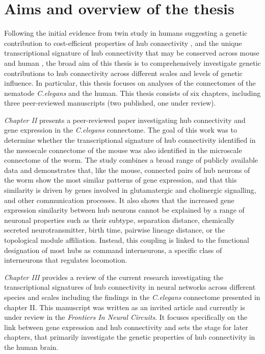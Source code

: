 \section{Aims and overview of the thesis}

Following the initial evidence from twin study in humans suggesting a genetic contribution to cost-efficient properties of hub connectivity \citep{Fornito2011}, and the unique transcriptional signature of hub connectivity that may be conserved across mouse and human \citep{Vertes2016b,Fulcher2016}, the broad aim of this thesis is to comprehensively investigate genetic contributions to hub connectivity across different scales and levels of genetic influence. In particular, this thesis focuses on analyses of the connectomes of the nematode \textit{C.elegans} and the human. This thesis consists of six chapters, including three peer-reviewed manuscripts (two published, one under review).

\textit{Chapter II} presents a peer-reviewed paper investigating hub connectivity and gene expression in the \textit{C.elegans} connectome. The goal of this work was to determine whether the transcriptional signature of hub connectivity identified in the mesoscale connectome of the mouse \citep{Fulcher2016} was also identified in the microscale connectome of the worm. The study combines a broad range of publicly available data and demonstrates that, like the mouse, connected pairs of hub neurons of the worm show the most similar patterns of gene expression, and that this similarity is driven by genes involved in glutamatergic and cholinergic signalling, and other communication processes. It also shows that the increased gene expression similarity between hub neurons cannot be explained by a range of neuronal properties such as their subtype, separation distance, chemically secreted neurotransmitter, birth time, pairwise lineage distance, or the topological module affiliation. Instead, this coupling is linked to the functional designation of most hubs as command interneurons, a specific class of interneurons that regulates locomotion.

\textit{Chapter III} provides a review of the current research investigating the transcriptional signatures of hub connectivity in neural networks across different species and scales including the findings in the \textit{C.elegans} connectome presented in chapter II. This manuscript was written as an invited article and currently is under review in the \textit{Frontiers In Neural Circuits}. It focuses specifically on the link between gene expression and hub connectivity and sets the stage for later chapters, that primarily investigate the genetic properties of hub connectivity in the human brain.

